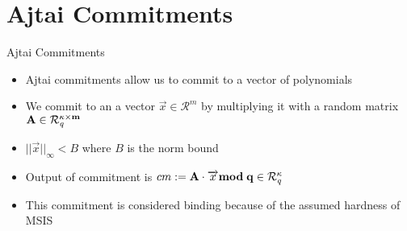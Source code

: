 \section{Ajtai Commitments}
\begin{frame}{Ajtai Commitments}
    \begin{itemize}
        \item Ajtai commitments allow us to commit to a vector of polynomials
        \item We commit to an a vector $\overrightarrow{x}  \in \mathcal{R}^{m}$ by multiplying it with a random matrix $\bf{A} \in \mathcal{R}^{\kappa \times m}_\mathit{q}$
        \item $||\overrightarrow{x}||_{\infty} < B$ where $B$ is the norm bound
        \item Output of commitment is  $cm := \bf{A} \cdot \overrightarrow{x} mod \; q \in \mathcal{R}^{\kappa}_{\mathit{q}}$
        \item This commitment is considered binding because of the assumed hardness of MSIS
    \end{itemize}
\end{frame}